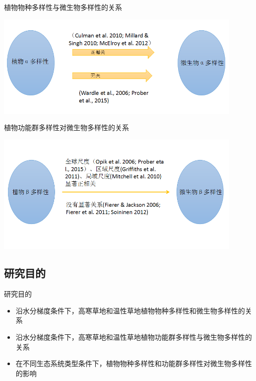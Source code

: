 \begin{frame}{\insertsection}{\insertsubsection}
	植物物种多样性与微生物多样性的关系
	\begin{center}
		\includegraphics[width = 0.9\textwidth]{./pic/1.2.4.png}
	\end{center}
\end{frame}

\begin{frame}{\insertsection}{\insertsubsection}
	植物功能群多样性对微生物多样性的关系
		\begin{center}
			\includegraphics[width = 0.9\textwidth]{./pic/1.2.5.png}
		\end{center}
\end{frame}


\subsection{研究目的}
\begin{frame}{\insertsection}{\insertsubsection}
	研究目的
	\begin{itemize}
		\item 沿水分梯度条件下，高寒草地和温性草地植物物种多样性和微生物多样性的关系
		\item 沿水分梯度条件下，高寒草地和温性草地植物功能群多样性与微生物多样性的关系
		\item 在不同生态系统类型条件下，植物物种多样性和功能群多样性对微生物多样性的影响
	\end{itemize}
\end{frame}